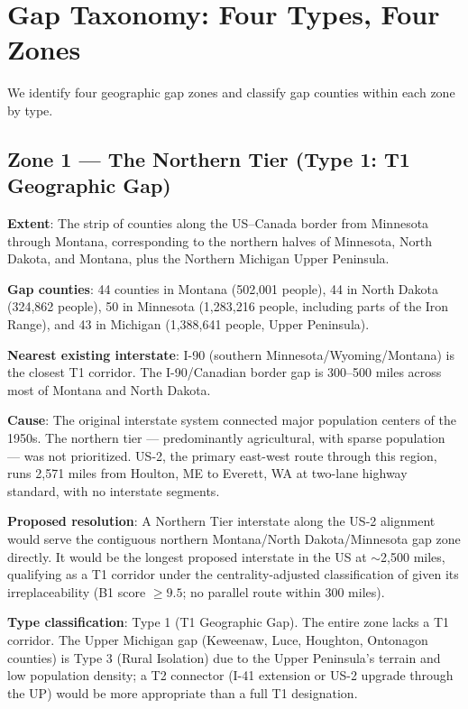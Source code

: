 \section{Gap Taxonomy: Four Types, Four Zones}
\label{sec:taxonomy}

We identify four geographic gap zones and classify gap counties within each zone by type.

\subsection{Zone 1 — The Northern Tier (Type 1: T1 Geographic Gap)}

\textbf{Extent}: The strip of counties along the US–Canada border from Minnesota through Montana, corresponding to the northern halves of Minnesota, North Dakota, and Montana, plus the Northern Michigan Upper Peninsula.

\textbf{Gap counties}: 44 counties in Montana (502,001 people), 44 in North Dakota (324,862 people), 50 in Minnesota (1,283,216 people, including parts of the Iron Range), and 43 in Michigan (1,388,641 people, Upper Peninsula).

\textbf{Nearest existing interstate}: I-90 (southern Minnesota/Wyoming/Montana) is the closest T1 corridor. The I-90/Canadian border gap is 300--500 miles across most of Montana and North Dakota.

\textbf{Cause}: The original interstate system connected major population centers of the 1950s. The northern tier --- predominantly agricultural, with sparse population --- was not prioritized. US-2, the primary east-west route through this region, runs 2,571 miles from Houlton, ME to Everett, WA at two-lane highway standard, with no interstate segments.

\textbf{Proposed resolution}: A Northern Tier interstate along the US-2 alignment would serve the contiguous northern Montana/North Dakota/Minnesota gap zone directly. It would be the longest proposed interstate in the US at $\sim$2,500 miles, qualifying as a T1 corridor under the centrality-adjusted classification of \citet{ROUTE_A1} given its irreplaceability (B1 score $\geq 9.5$; no parallel route within 300 miles).

\textbf{Type classification}: Type 1 (T1 Geographic Gap). The entire zone lacks a T1 corridor. The Upper Michigan gap (Keweenaw, Luce, Houghton, Ontonagon counties) is Type 3 (Rural Isolation) due to the Upper Peninsula's terrain and low population density; a T2 connector (I-41 extension or US-2 upgrade through the UP) would be more appropriate than a full T1 designation.


